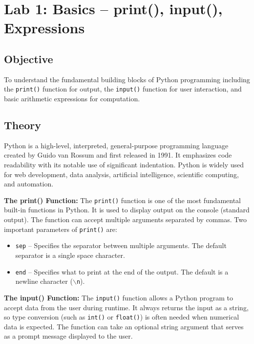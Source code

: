 \documentclass[12pt,a4paper]{article}
\begin{document}
\newpage
\thispagestyle{fancy}
\tableofcontents
\newpage

\section{Lab 1: Basics -- print(), input(), Expressions}

\subsection{Objective}
To understand the fundamental building blocks of Python programming including the \texttt{print()} function for output, the \texttt{input()} function for user interaction, and basic arithmetic expressions for computation.

\subsection{Theory}

Python is a high-level, interpreted, general-purpose programming language created by Guido van Rossum and first released in 1991. It emphasizes code readability with its notable use of significant indentation. Python is widely used for web development, data analysis, artificial intelligence, scientific computing, and automation.

\textbf{The print() Function:}
The \texttt{print()} function is one of the most fundamental built-in functions in Python. It is used to display output on the console (standard output). The function can accept multiple arguments separated by commas. Two important parameters of \texttt{print()} are:
\begin{itemize}
  \item \texttt{sep} -- Specifies the separator between multiple arguments. The default separator is a single space character.
  \item \texttt{end} -- Specifies what to print at the end of the output. The default is a newline character (\texttt{$\backslash$n}).
\end{itemize}

\textbf{The input() Function:}
The \texttt{input()} function allows a Python program to accept data from the user during runtime. It always returns the input as a string, so type conversion (such as \texttt{int()} or \texttt{float()}) is often needed when numerical data is expected. The function can take an optional string argument that serves as a prompt message displayed to the user.
\end{document}
